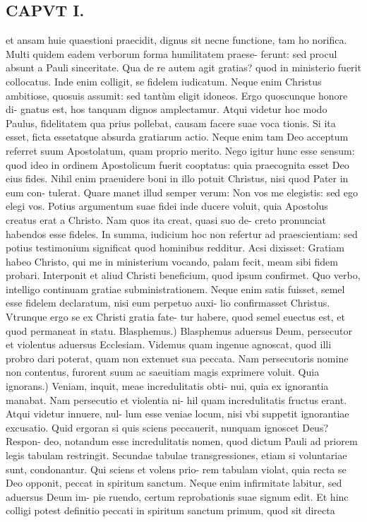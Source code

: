 \documentclass{article}
\begin{document}
\begin{pages}
\section*{CAPVT I. }
\marginpar{[ p.9 ]}\pstart et ansam huie quaestioni praecidit, dignus sit necne functione, tam ho norifica. Multi quidem eadem verborum forma humilitatem praese- ferunt: sed procul absunt a Pauli sinceritate. Qua de re autem agit gratias? quod in ministerio fuerit collocatus. Inde enim colligit, se fidelem iudicatum. Neque enim Christus ambitiose, quosuis assumit: sed tantùm eligit idoneos. Ergo quoscunque honore di- gnatus est, hos tanquam dignos amplectamur. Atqui videtur hoc modo Paulus, fidelitatem qua prius pollebat, causam facere suae voca tionis. Si ita esset, ficta essetatque absurda gratiarum actio. Neque enim tam Deo acceptum referret suum Apostolatum, quam proprio merito. Nego igitur hunc esse sensum: quod ideo in ordinem Apostolicum fuerit cooptatus: quia praecognita esset Deo eius fides. Nihil enim praeuidere boni in illo potuit Christus, nisi quod Pater in eum con- tulerat. Quare manet illud semper verum: Non vos me elegistis: sed ego elegi vos. Potius argumentum suae fidei inde ducere voluit, quia Apostolus creatus erat a Christo. Nam quos ita creat, quasi suo de- creto pronunciat habendos esse fideles. In summa, iudicium hoc non refertur ad praescientiam: sed potius testimonium significat quod hominibus redditur. Acsi dixisset: Gratiam habeo Christo, qui me in ministerium vocando, palam fecit, meam sibi fidem probari. Interponit et aliud Christi beneficium, quod ipsum confirmet. Quo verbo, intelligo continuam gratiae subministrationem. Neque enim satis fuisset, semel esse fidelem declaratum, nisi eum perpetuo auxi- lio confirmasset Christus. Vtrunque ergo se ex Christi gratia fate- tur habere, quod semel euectus est, et quod permaneat in statu.  \pend\pstart Blasphemus.) Blasphemus aduersus Deum, persecutor et violentus aduersus Ecclesiam. Videmus quam ingenue agnoscat, quod illi probro dari poterat, quam non extenuet sua peccata. Nam persecutoris nomine non contentus, furorent suum ac saeuitiam magis exprimere voluit.  \pend\pstart Quia ignorans.) Veniam, inquit, meae incredulitatis obti- nui, quia ex ignorantia manabat. Nam persecutio et violentia ni- hil quam incredulitatis fructus erant. Atqui videtur innuere, nul- lum esse veniae locum, nisi vbi suppetit ignorantiae excusatio. Quid ergoran si quis sciens peccauerit, nunquam ignoscet Deus? Respon- deo, notandum esse incredulitatis nomen, quod dictum Pauli ad priorem legis tabulam restringit. Secundae tabulae transgressiones, etiam si voluntariae sunt, condonantur. Qui sciens et volens prio- rem tabulam violat, quia recta se Deo opponit, peccat in spiritum sanctum. Neque enim infirmitate labitur, sed aduersus Deum im- pie ruendo, certum reprobationis suae signum edit. Et hinc colligi potest definitio peccati in spiritum sanctum primum, quod sit directa  \pend

\end{pages}
\end{document}
